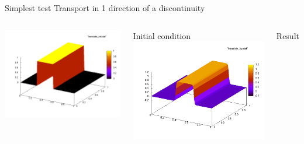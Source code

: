 \documentclass{beamer}
\begin{document}
  \begin{frame}{Simplest test}
    Transport in 1 direction of a discontinuity
    \begin{columns}[c]
        \includegraphics[width=\textwidth]{img/creneau_ci.png}

        Initial condition
        \includegraphics[width=\textwidth]{img/creneau_weno.png}

        Result
    \end{columns}
  \end{frame}
\end{document}
